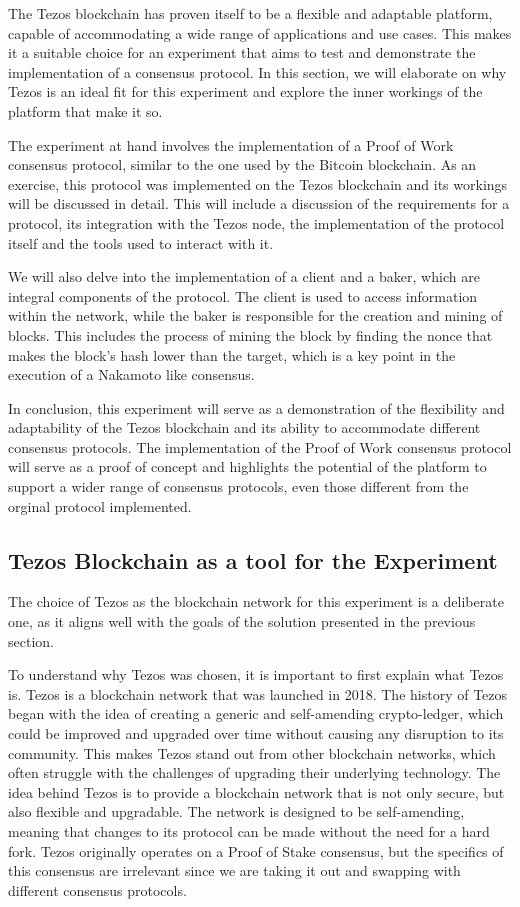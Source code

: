 The Tezos blockchain has proven itself to be a flexible and adaptable platform, capable of accommodating a wide range of applications and use cases. This makes it a suitable choice for an experiment that aims to test and demonstrate the implementation of a consensus protocol. In this section, we will elaborate on why Tezos is an ideal fit for this experiment and explore the inner workings of the platform that make it so.

The experiment at hand involves the implementation of a Proof of Work consensus protocol, similar to the one used by the Bitcoin blockchain.
As an exercise, this protocol was implemented on the Tezos blockchain and its workings will be discussed in detail. This will include a discussion of the requirements for a protocol, its integration with the Tezos node, the implementation of the protocol itself and the tools used to interact with it.

We will also delve into the implementation of a client and a baker, which are integral components of the protocol. The client is used to access information within the network, while the baker is responsible for the creation and mining of blocks. This includes the process of mining the block by finding the nonce that makes the block's hash lower than the target, which is a key point in the execution of a Nakamoto like consensus.

In conclusion, this experiment will serve as a demonstration of the flexibility and adaptability of the Tezos blockchain and its ability to accommodate different consensus protocols. The implementation of the Proof of Work consensus protocol will serve as a proof of concept and highlights the potential of the platform to support a wider range of consensus protocols, even those different from the orginal protocol implemented.

\subsection*{\textbf{Tezos Blockchain as a tool for the Experiment}}
The choice of Tezos as the blockchain network for this experiment is a deliberate one, as it aligns well with the goals of the solution presented in the previous section.

To understand why Tezos was chosen, it is important to first explain what Tezos is. Tezos is a blockchain network that was launched in 2018. The history of Tezos began with the idea of creating a generic and self-amending crypto-ledger, which could be improved and upgraded over time without causing any disruption to its community. This makes Tezos stand out from other blockchain networks, which often struggle with the challenges of upgrading their underlying technology. The idea behind Tezos is to provide a blockchain network that is not only secure, but also flexible and upgradable. The network is designed to be self-amending, meaning that changes to its protocol can be made without the need for a hard fork. Tezos originally operates on a Proof of Stake consensus, but the specifics of this consensus are irrelevant since we are taking it out and swapping with different consensus protocols.


